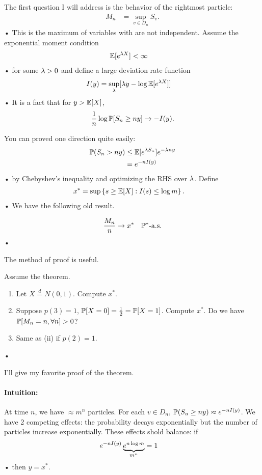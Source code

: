 The first question I will address is the behavior of the rightmost particle:
\begin{align*}
M_n &=\sup_{v\in D_n} S_v.
\end{align*}•
This is the maximum of variables with are not independent. %
Assume the exponential moment condition
\begin{align*}
\mathbb{E}[e^{\lambda X}] &<\infty
\end{align*}•
for some $\lambda>0$ and define a large deviation rate function
\begin{align*}
I(y) &= \sup_\lambda [\lambda y - \log \mathbb{E}[e^{\lambda X}]]
\end{align*}•
It is a fact that for $y>\mathbb{E}[X]$, 
$$\frac{1}{n} \log \mathbb{P}[S_n\ge ny]\to -I(y).$$

You can proved one direction quite easily:
\begin{align*}
\mathbb{P}(S_n>ny) &\le \mathbb{E}[e^{\lambda S_n}]e^{-\lambda ny}\\
&= e^{-n I(y)}
\end{align*}•
by Chebyshev's inequality and optimizing the RHS over $\lambda$. %
Define
\begin{align*}
x^* &= \sup \left\{{s\ge \mathbb{E}[X]}:{I(s)\le \log m}\right\}.
\end{align*}•
We have the following old result.
\begin{thm}
\begin{align*}
\frac{M_n}{n} &\to x^*&\mathbb{P}^*\text{-a.s.}
\end{align*}•
\end{thm}
The method of proof is useful.
\begin{exr}
Assume the theorem.
\begin{enumerate}
\item
Let $X\stackrel d=N(0,1)$. Compute $x^*$.
\item 
Suppose $p(3)=1$, $\mathbb{P}[X=0]=\frac{1}{2} = \mathbb{P}[X=1]$. Compute $x^*$. Do we have $\mathbb{P}[M_n=n,\forall n]>0$?
\item
Same as (ii) if $p(2)=1$.
\end{enumerate}•
\end{exr}
I'll give my favorite proof of the theorem.

\paragraph{Intuition:} At time $n$, we have $\approx m^n$ particles. For each $v\in D_n$, $\mathbb{P}(S_u\ge ny) \approx e^{-n I(y)}$. We have 2 competing effects: the probability decays exponentially but the number of particles increase exponentially. These effects shold balance: if
\begin{align*}
e^{-n I(y)} \underbrace{e^{n\log m}}_{m^n} &=1
\end{align*}•
then $y=x^*$.

